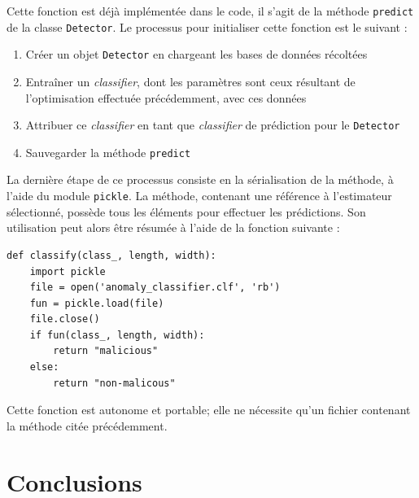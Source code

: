 \documentclass[a4paper]{report}
\begin{document}
Cette fonction est déjà implémentée dans le code, il s'agit de la méthode \texttt{predict} de la classe \texttt{Detector}. Le processus pour initialiser cette fonction est le suivant :
\begin{enumerate}
\item Créer un objet \texttt{Detector} en chargeant les bases de données récoltées
\item Entraîner un \emph{classifier}, dont les paramètres sont ceux résultant de l'optimisation effectuée précédemment, avec ces données
\item Attribuer ce \emph{classifier} en tant que \emph{classifier} de prédiction pour le \texttt{Detector}
\item Sauvegarder la méthode \texttt{predict}
\end{enumerate}
La dernière étape de ce processus consiste en la sérialisation de la méthode, à l'aide du module \texttt{pickle}. La méthode, contenant une référence à l'estimateur sélectionné, possède tous les éléments pour effectuer les prédictions. Son utilisation peut alors être résumée à l'aide de la fonction suivante :
\begin{verbatim}
def classify(class_, length, width):
    import pickle
    file = open('anomaly_classifier.clf', 'rb')
    fun = pickle.load(file)
    file.close()
    if fun(class_, length, width):
        return "malicious"
    else:
        return "non-malicous"
\end{verbatim}
Cette fonction est autonome et portable; elle ne nécessite qu'un fichier contenant la méthode citée précédemment.

\chapter{Conclusions}
\end{document}
